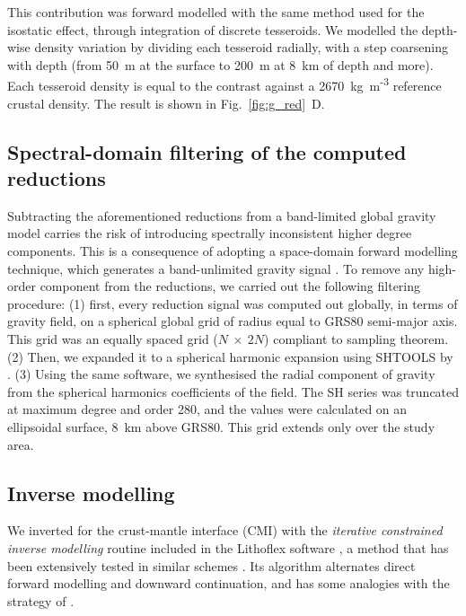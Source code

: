 This contribution was forward modelled with the same method used for the isostatic effect, through integration of discrete tesseroids.
We modelled the depth-wise density variation by dividing each tesseroid radially, with a step coarsening with depth (from 50~m at the surface to 200~m at 8~km of depth and more).
Each tesseroid density is equal to the contrast against a 2670~{kg~m\textsuperscript{-3}} reference crustal density.
The result is shown in Fig.~\ref{fig:g_red}~D.

\subsection{Spectral-domain filtering of the computed reductions}
\label{ss:Appl:GravSpectralFiltering}
Subtracting the aforementioned reductions from a band-limited global gravity model carries the risk of introducing spectrally inconsistent higher degree components.
This is a consequence of adopting a space-domain forward modelling technique, which generates a band-unlimited gravity signal \parencite{Hirt2014}.
To remove any high-order component from the reductions, we carried out the following filtering procedure:
(1) first, every reduction signal was computed out globally, in terms of gravity field, on a spherical global grid of radius equal to {GRS80} semi-major axis.
This grid was an equally spaced grid ($N~\times~2N$) compliant to \textcite{Driscoll1994} sampling theorem.
(2) Then, we expanded it to a spherical harmonic expansion using {SHTOOLS} by \textcite{Wieczorek2018}. \nocite{SHTOOLS43Wieczorek2018}
(3) Using the same software, we synthesised the radial component of gravity from the spherical harmonics coefficients of the field. The SH series was truncated at maximum degree and order 280, and the values were calculated on an ellipsoidal surface, 8~km above GRS80.
This grid extends only over the study area.

\subsection{Inverse modelling}
\label{ss:Appl:GravInv}
We inverted for the crust-mantle interface (CMI) with the \textit{iterative constrained inverse modelling} routine included in the Lithoflex software \parencite{Braitenberg2007}, a method that has been extensively tested in similar schemes \parencites{Ebbing2001}{Mariani2013}.
Its algorithm alternates direct forward modelling and downward continuation, and has some analogies with the strategy of \textcite{Oldenburg1974}.

